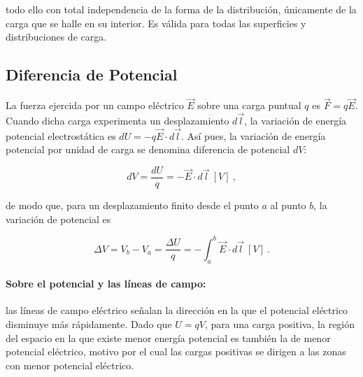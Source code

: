 \documentclass{tufte-handout}
\begin{document}
todo ello con total independencia de la forma de la distribución, únicamente de la carga que se halle en su interior. Es válida para todas las superficies y distribuciones de carga.

\subsection{Diferencia de Potencial}

La fuerza ejercida por un campo eléctrico $\vec{E}$ sobre una carga puntual $q$ es $\vec{F} = q\vec{E}$. Cuando dicha carga experimenta un desplazamiento $d\vec{l}$, la variación de energía potencial electrostática es $dU = -q\vec{E}\cdot d\vec{l}$. Así pues, la variación de energía potencial por unidad de carga se denomina diferencia de potencial $dV$:





\begin{equation}
dV = \frac{dU}{q} = -\vec{E}\cdot d\vec{l}~[V]~,
\end{equation}

de modo que, para un desplazamiento finito desde el punto $a$ al punto $b$, la variación de potencial es

\begin{equation}
\Delta V = V_b - V_a = \frac{\Delta U}{q} = -\int_a^b \vec{E}\cdot d\vec{l}~[V]~.
\end{equation}

\paragraph{Sobre el potencial y las líneas de campo:} las líneas de campo eléctrico señalan la dirección en la que el potencial eléctrico disminuye más rápidamente. Dado que $U = qV$, para una carga positiva, la región del espacio en la que existe menor energía potencial es también la de menor potencial eléctrico, motivo por el cual las cargas positivas se dirigen a las zonas con menor potencial eléctrico.
\end{document}

